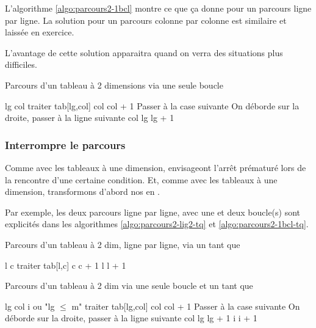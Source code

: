 L'algorithme \vref{algo:parcours2-1bcl} montre ce que ça donne
pour un parcours ligne par ligne.
La solution pour un parcours colonne par colonne est similaire
et laissée en exercice.

L'avantage de cette solution apparaitra 
quand on verra des situations plus difficiles.

\begin{algorithm}[H]
\begin{pseudo}
	\caption{Parcours d'un tableau à 2 dimensions via une seule boucle}
	\label{algo:parcours2-1bcl}
	\Let lg 
	\Let col 
		\Stmt traiter tab[lg,col]
		\Let col \Gets col + 1	\RComment Passer à la case suivante
		 \RComment On déborde sur la droite, passer à la ligne suivante
			\Let col 
			\Let lg \Gets lg + 1
		\EndIf
	\EndFor
\end{pseudo}
\end{algorithm}

\subsubsection*{Interrompre le parcours}

Comme avec les tableaux à une dimension, 
envisageont l'arrêt prématuré lors de la rencontre d'une certaine condition.
Et, comme avec les tableaux à une dimension, 
transformons d'abord nos  en .

Par exemple, les deux parcours ligne par ligne, avec une et deux boucle(s)
sont explicités dans les algorithmes \vref{algo:parcours2-lig2-tq}
et \vref{algo:parcours2-1bcl-tq}.

\begin{algorithm}[H]
\begin{pseudo}
	\caption{Parcours d'un tableau à 2 dim, ligne par ligne, via un tant que}
	\label{algo:parcours2-lig2-tq}
	\Let l 
		\Let c 
			\Stmt traiter tab[l,c]
			\Let c \Gets c + 1
		\EndWhile
		\Let l \Gets l + 1
	\EndWhile
\end{pseudo}
\end{algorithm}

\begin{algorithm}[H]
\begin{pseudo}
	\caption{Parcours d'un tableau à 2 dim via une seule boucle et un tant que}
	\label{algo:parcours2-1bcl-tq}
	\Let lg 
	\Let col 
	\Let i 
	 \RComment ou "lg $\le$ m" 
		\Stmt traiter tab[lg,col]
		\Let col \Gets col + 1	\RComment Passer à la case suivante
		 \RComment On déborde sur la droite, passer à la ligne suivante
			\Let col 
			\Let lg \Gets lg + 1
		\EndIf
		\Let i \Gets i + 1		
	\EndWhile
\end{pseudo}
\end{algorithm}

